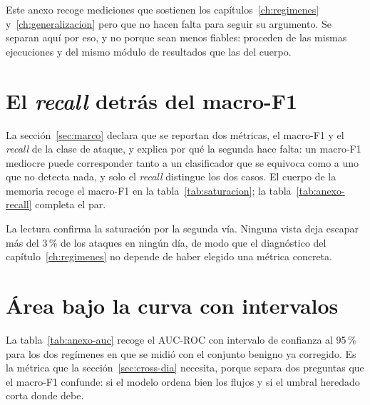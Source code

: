 %

Este anexo recoge mediciones que sostienen los capítulos~\ref{ch:regimenes}
y~\ref{ch:generalizacion} pero que no hacen falta para seguir su argumento. Se
separan aquí por eso, y no porque sean menos fiables: proceden de las mismas
ejecuciones y del mismo módulo de resultados que las del cuerpo.

\section{El \emph{recall} detrás del macro-F1}

La sección~\ref{sec:marco} declara que se reportan dos métricas, el macro-F1 y
el \emph{recall} de la clase de ataque, y explica por qué la segunda hace falta:
un macro-F1 mediocre puede corresponder tanto a un clasificador que se equivoca
como a uno que no detecta nada, y solo el \emph{recall} distingue los dos casos.
El cuerpo de la memoria recoge el macro-F1 en la tabla~\ref{tab:saturacion}; la
tabla~\ref{tab:anexo-recall} completa el par.

La lectura confirma la saturación por la segunda vía. Ninguna vista deja escapar
más del 3\,\% de los ataques en ningún día, de modo que el diagnóstico del
capítulo~\ref{ch:regimenes} no depende de haber elegido una métrica concreta.


\section{Área bajo la curva con intervalos}

La tabla~\ref{tab:anexo-auc} recoge el AUC-ROC con intervalo de confianza al
95\,\% para los dos regímenes en que se midió con el conjunto benigno ya
corregido. Es la métrica que la sección~\ref{sec:cross-dia} necesita, porque
separa dos preguntas que el macro-F1 confunde: si el modelo ordena bien los
flujos y si el umbral heredado corta donde debe.

